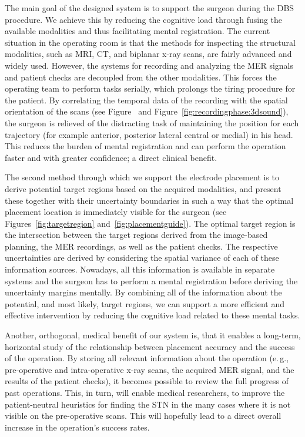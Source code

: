 \documentclass{egpubl}
\begin{document}
The main goal of the designed system is to support the surgeon during the DBS procedure. We achieve this by reducing the cognitive load through fusing the available modalities and thus facilitating mental registration. The current situation in the operating room is that the methods for inspecting the structural modalities, such as MRI, CT, and biplanar x-ray scans, are fairly advanced and widely used. However, the systems for recording and analyzing the MER signals and patient checks are decoupled from the other modalities. This forces the operating team to perform tasks serially, which prolongs the tiring procedure for the patient. By correlating the temporal data of the recording with the spatial orientation of the scans (see Figure~\label{fig:screenshot} and Figure~\ref{fig:recordingphase:3dsound}), the surgeon is relieved of the distracting task of maintaining the position for each trajectory (for example anterior, posterior lateral central or medial) in his head. This reduces the burden of mental registration and can perform the operation faster and with greater confidence; a direct clinical benefit.

The second method through which we support the electrode placement is to derive potential target regions based on the acquired modalities, and present these together with their uncertainty boundaries in such a way that the optimal placement location is immediately visible for the surgeon (see Figures~\ref{fig:targetregion} and~\ref{fig:placementguide}). The optimal target region is the intersection between the target regions derived from the image-based planning, the MER recordings, as well as the patient checks. The respective uncertainties are derived by considering the spatial variance of each of these information sources. Nowadays, all this information is available in separate systems and the surgeon has to perform a mental registration before deriving the uncertainty margins mentally. By combining all of the information about the potential, and most likely, target regions, we can support a more efficient and effective intervention by reducing the cognitive load related to these mental tasks.

Another, orthogonal, medical benefit of our system is, that it enables a long-term, horizontal study of the relationship between placement accuracy and the success of the operation. By storing all relevant information about the operation (e.\,g., pre-operative and intra-operative x-ray scans, the acquired MER signal, and the results of the patient checks), it becomes possible to review the full progress of past operations. This, in turn, will enable medical researchers, to improve the patient-neutral heuristics for finding the STN in the many cases where it is not visible on the pre-operative scans. This will hopefully lead to a direct overall increase in the operation's success rates.
\end{document}
